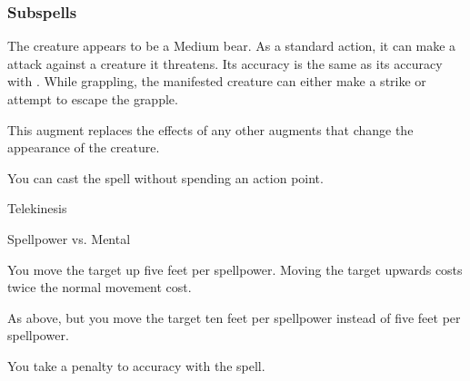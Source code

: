 \subsubsection{Subspells}



The creature appears to be a Medium bear.
As a standard action, it can make a  attack against a creature it threatens.
Its accuracy is the same as its accuracy with .
While grappling, the manifested creature can either make a strike or attempt to escape the grapple.

This augment replaces the effects of any other augments that change the appearance of the creature.






You can cast the spell without spending an action point.




\newpage
\begin{spellsection}{Telekinesis}

\begin{spellcontent}

\begin{spelltargetinginfo}




\end{spelltargetinginfo}


\begin{spelleffects}




\begin{spellattack}{Spellpower vs. Mental}


\spellsuccess
You move the target up five feet per spellpower. Moving the target upwards costs twice the normal movement cost.



\spellcritical
As above, but you move the target ten feet per spellpower instead of five feet per spellpower.



\end{spellattack}





\end{spelleffects}

\end{spellcontent}
\begin{spellfooter}


\end{spellfooter}
\begin{spellsubcontent}


\begin{spellcantrip}
You take a  penalty to accuracy with the spell.
\end{spellcantrip}


\end{spellsubcontent}
\end{spellsection}


